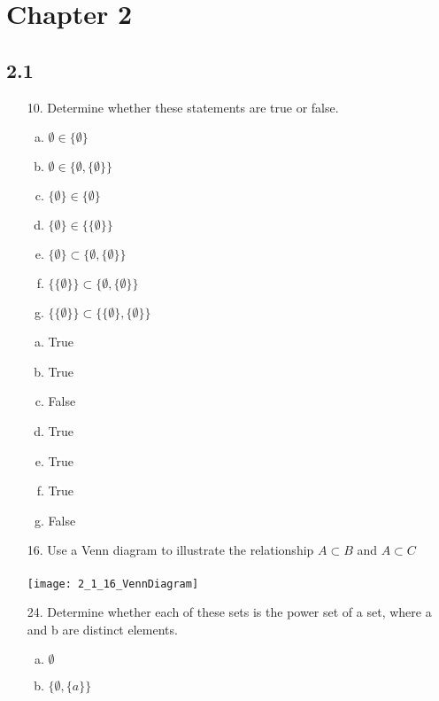 \section{Chapter 2}
\subsection{2.1}
\begin{itemize}
   \item[10.] Determine whether these statements are true or false.
         \begin{enumerate}[a.]
            \item $\emptyset \in \{\emptyset\} $
            \item $\emptyset \in \{\emptyset, \{\emptyset \}\}$
            \item $\{\emptyset\} \in \{\emptyset \}$
            \item $\{\emptyset\} \in \{\{\emptyset\}\}$
            \item $\{\emptyset\} \subset \{\emptyset, \{\emptyset\}\}$
            \item $\{\{\emptyset\}\} \subset \{\emptyset, \{\emptyset\}\}$
            \item $\{\{\emptyset\}\} \subset \{\{\emptyset\}, \{\emptyset\}\}$
         \end{enumerate}
         \answer
         \begin{enumerate}[a.]
            \item True
            \item True
            \item False
            \item True
            \item True
            \item True
            \item False
         \end{enumerate}
   \item[16.] Use a Venn diagram to illustrate the relationship $A \subset B$ and $A \subset C$\\
         \answer \\
         \texttt{[image: 2\_1\_16\_VennDiagram]}
   \item[24.] Determine whether each of these sets is the power set of a set, where a and b are distinct elements.
         \begin{enumerate}[a.]
            \item $\emptyset$
            \item $\{\emptyset, \{a\}\}$

\end{enumerate}
\end{itemize}
